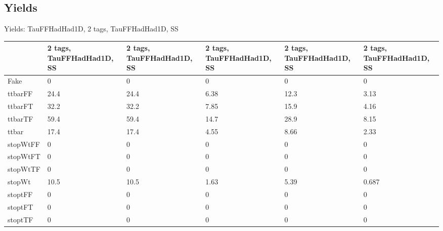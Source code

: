 
\subsection{Yields}

\begin{frame}{Yields: TauFFHadHad1D, 2 tags, TauFFHadHad1D, SS}
\begin{center}
  \begin{tabular}{l| >{\centering\let\newline\\\arraybackslash\hspace{0pt}}m{1.4cm}| >{\centering\let\newline\\\arraybackslash\hspace{0pt}}m{1.4cm}| >{\centering\let\newline\\\arraybackslash\hspace{0pt}}m{1.4cm}| >{\centering\let\newline\\\arraybackslash\hspace{0pt}}m{1.4cm}| >{\centering\let\newline\\\arraybackslash\hspace{0pt}}m{1.4cm}}
    & 2 tags, TauFFHadHad1D, SS & 2 tags, TauFFHadHad1D, SS & 2 tags, TauFFHadHad1D, SS & 2 tags, TauFFHadHad1D, SS & 2 tags, TauFFHadHad1D, SS \\
 \hline \hline
    Fake& 0 & 0 & 0 & 0 & 0 \\
 \hline
    ttbarFF& 24.4 & 24.4 & 6.38 & 12.3 & 3.13 \\
 \hline
    ttbarFT& 32.2 & 32.2 & 7.85 & 15.9 & 4.16 \\
 \hline
    ttbarTF& 59.4 & 59.4 & 14.7 & 28.9 & 8.15 \\
 \hline
    ttbar& 17.4 & 17.4 & 4.55 & 8.66 & 2.33 \\
 \hline
    stopWtFF& 0 & 0 & 0 & 0 & 0 \\
 \hline
    stopWtFT& 0 & 0 & 0 & 0 & 0 \\
 \hline
    stopWtTF& 0 & 0 & 0 & 0 & 0 \\
 \hline
    stopWt& 10.5 & 10.5 & 1.63 & 5.39 & 0.687 \\
 \hline
    stoptFF& 0 & 0 & 0 & 0 & 0 \\
 \hline
    stoptFT& 0 & 0 & 0 & 0 & 0 \\
 \hline
    stoptTF& 0 & 0 & 0 & 0 & 0 \\

\end{tabular}
\end{center}
\end{frame}
